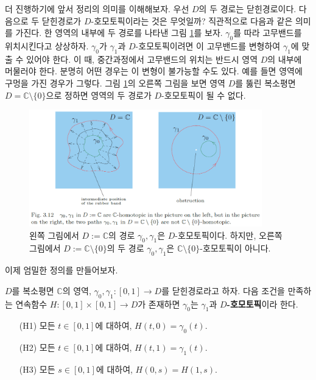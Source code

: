 더 진행하기에 앞서 정리의 의미를 이해해보자.
우선 $D$의 두 경로는 닫힌경로이다.
다음으로 두 닫힌경로가 $D$-호모토픽이라는 것은 무엇일까?
직관적으로 다음과 같은 의미를 가진다.
한 영역의 내부에 두 경로를 나타낸 그림 \ref{fig-3-12}를 보자.
$\gamma_0$를 따라 고무밴드를 위치시킨다고 상상하자.
$\gamma_0$가 $\gamma_1$과 $D$-호모토픽이려면
이 고무밴드를 변형하여 $\gamma_1$에 맞출 수 있어야 한다.
이 때, 중간과정에서 고무밴드의 위치는 반드시 영역 $D$의 내부에 머물러야 한다.
분명히 어떤 경우는 이 변형이 불가능할 수도 있다. 
예를 들면 영역에 구멍을 가진 경우가 그렇다.
그림 \ref{fig-3-12}의 오른쪽 그림을 보면 
영역 $D$를 뚫린 복소평면 $D=\mathbb C\setminus \{0\}$으로 정하면
영역의 두 경로가 $D$-호모토픽이 될 수 없다.

\begin{figure}[!h]
\begin{center}
\includegraphics[width=0.9\textwidth]{./SaltChapter/fig-3-12}
\end{center}
\caption{왼쪽 그림에서 $D:=\mathbb C$의 경로 $\gamma_0, \gamma_1$은 $D$-호모토픽이다.
하지만, 오른쪽 그림에서 $D:=\mathbb C\setminus\{0\}$의 두 경로
$\gamma_0, \gamma_1$은 $\mathbb C\setminus\{0\}$-호모토픽이 아니다.}
\label{fig-3-12}
\end{figure}

이제 엄밀한 정의를 만들어보자.

\begin{salt_definition} \label{def-3-3}
$D$를 복소평면 $\mathbb C$의 영역,
$\gamma_0, \gamma_1 : [0,1] \to D$를 닫힌경로라고 하자.
다음 조건을 만족하는 연속함수 $H:[0,1]\times[0,1]\to D$가 존재하면
$\gamma_0$는 $\gamma_1$과 {\bf $D$-호모토픽}이라 한다.
\begin{itemize}
\item[(H1)] 모든 $t\in [0,1]$에 대하여, $H(t,0)=\gamma_0(t)$.
\item[(H2)] 모든 $t\in [0,1]$에 대하여, $H(t,1)=\gamma_1(t)$.
\item[(H3)] 모든 $s\in [0,1]$에 대하여, $H(0,s)=H(1,s)$.
\end{itemize}
\end{salt_definition}

